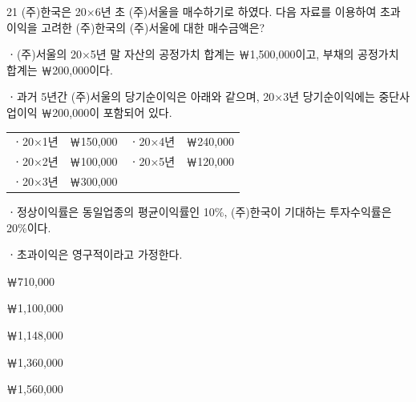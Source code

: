 \begin{question}{21}
(주)한국은 20×6년 초 (주)서울을 매수하기로 하였다. 다음 자료를 이용하여 초과이익을 고려한 (주)한국의 (주)서울에 대한 매수금액은?
\begin{framedtext}
ㆍ(주)서울의 20×5년 말 자산의 공정가치 합계는 ￦1,500,000이고, 부채의 공정가치 합계는 ￦200,000이다. \par
ㆍ과거 5년간 (주)서울의 당기순이익은 아래와 같으며, 20×3년 당기순이익에는 중단사업이익 ￦200,000이 포함되어 있다. \par
\begin{center}\small
\begin{tabular}{@{}lrlr@{}}
\hline
ㆍ20×1년 & ￦150,000 & ㆍ20×4년 & ￦240,000 \\
ㆍ20×2년 & ￦100,000 & ㆍ20×5년 & ￦120,000 \\
ㆍ20×3년 & ￦300,000 & & \\
\hline
\end{tabular}
\end{center}
ㆍ정상이익률은 동일업종의 평균이익률인 10\%, (주)한국이 기대하는 투자수익률은 20\%이다. \par
ㆍ초과이익은 영구적이라고 가정한다. \par
\end{framedtext}
\begin{choices}
  \item ￦710,000
  \item ￦1,100,000
  \item ￦1,148,000
  \item ￦1,360,000
  \item ￦1,560,000
\end{choices}
\end{question}
